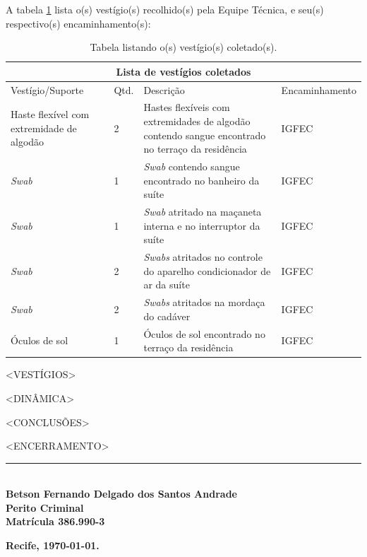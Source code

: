 \documentclass[a4paper,12pt,oneside]{article}
\newcounter{c}
\newcounter{d}
\newcounter{u}
\begin{document}

A tabela \ref{encaminhamentos} lista o(s) vestígio(s) recolhido(s) pela Equipe Técnica, e seu(s) respectivo(s) encaminhamento(s):


\vspace{18pt}
\begin{table}[H]
	\centering
	\begin{tabular}{ |p{4cm}|p{0.8cm}|p{6cm}|p{3cm}|  }
		\hline
		\multicolumn{4}{|c|}{\textbf{Lista de vestígios coletados}} \\
		\hline
		Vestígio/Suporte & Qtd. & Descrição & Encaminhamento\\
		\hline
		\hline
		Haste flexível com extremidade de algodão & 2 & Hastes flexíveis com extremidades de algodão contendo sangue encontrado no terraço da residência & IGFEC\\
		\hline
		{\sl Swab} & 1 & {\sl Swab} contendo sangue encontrado no banheiro da suíte & IGFEC\\
		\hline
		{\sl Swab} & 1 & {\sl Swab} atritado na maçaneta interna e no interruptor da suíte & IGFEC\\
		\hline
		{\sl Swab} & 2 & {\sl Swabs} atritados no controle do aparelho condicionador de ar da suíte & IGFEC\\
		\hline
		{\sl Swab} & 2 & {\sl Swabs} atritados na mordaça do cadáver & IGFEC\\
		\hline
		Óculos de sol & 1 & Óculos de sol encontrado no terraço da residência & IGFEC\\
		\hline
		\hline
	\end{tabular}
	\caption{Tabela listando o(s) vestígio(s) coletado(s).}
	\label{encaminhamentos}
\end{table}

<VESTÍGIOS>

<DINÂMICA>

<CONCLUSÕES>

<ENCERRAMENTO>

\centering


\vspace{75pt}

\rule{300pt}{1.5pt}\\
\textbf{Betson Fernando Delgado dos Santos Andrade\\Perito Criminal\\Matrícula 386.990-3\vspace{36pt}}

\raggedleft \textbf{Recife, \today.}

\label{pagfim}
\end{document}
